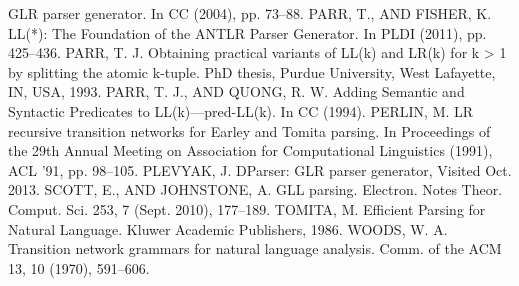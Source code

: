 \begin{thebibliography}{99}
GLR parser generator. In CC (2004), pp. 73–88.
PARR, T., AND FISHER, K. LL(*): The Foundation of the
ANTLR Parser Generator. In PLDI (2011), pp. 425–436.
PARR, T. J. Obtaining practical variants of LL(k) and LR(k)
for k > 1 by splitting the atomic k-tuple. PhD thesis, Purdue
University, West Lafayette, IN, USA, 1993.
PARR, T. J., AND QUONG, R. W. Adding Semantic and Syntactic
Predicates to LL(k)—pred-LL(k). In CC (1994).
PERLIN, M. LR recursive transition networks for Earley and
Tomita parsing. In Proceedings of the 29th Annual Meeting
on Association for Computational Linguistics (1991), ACL ’91,
pp. 98–105.
PLEVYAK, J. DParser: GLR parser generator, Visited Oct. 2013.
SCOTT, E., AND JOHNSTONE, A. GLL parsing. Electron. Notes
Theor. Comput. Sci. 253, 7 (Sept. 2010), 177–189.
TOMITA, M. Efficient Parsing for Natural Language. Kluwer
Academic Publishers, 1986.
WOODS, W. A. Transition network grammars for natural language
analysis. Comm. of the ACM 13, 10 (1970), 591–606.
\end{thebibliography}
